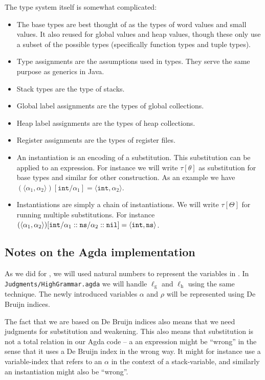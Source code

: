 The type system itself is somewhat complicated:

\begin{itemize}
\item The base types are best thought of as the types of word values and small
  values. It also reused for global values and heap values, though these only
  use a subset of the possible types (specifically function types and tuple types).
\item Type assignments are the assumptions used in types. They serve the same
  purpose as generics in Java.
\item Stack types are the type of stacks.
\item Global label assignments are the types of global collections.
\item Heap label assignments are the types of heap collections.
\item Register assignments are the types of register files.
\item An instantiation is an encoding of a substitution. This substitution can
  be applied to an expression. For instance we will write $\tau[\theta]$ as
  substitution for base types and similar for other construction. As an example
  we have
  $(\langle \alpha_1, \alpha_2 \rangle)[\mathtt{int} / \alpha_1] = \langle
  \mathtt{int}, \alpha_2 \rangle$.
\item Instantiations are simply a chain of instantiations. We will write
  $\tau[\Theta]$ for running multiple substitutions.  For instance
  $(\langle \alpha_1, \alpha_2 \rangle)[\mathtt{int} / \alpha_1 :: \mathtt{ns} /
  \alpha_2 :: \mathtt{nil}] = \langle \mathtt{int}, \mathtt{ns} \rangle$.
\end{itemize}

\subsection{Notes on the Agda implementation}

As we did for \ATALe, we will used natural numbers to represent the variables in
\ATAL. In \texttt{Judgments/HighGrammar.agda} we will handle $\ell_{\mathrm{g}}$
and $\ell_{\mathrm{h}}$ using the same technique. The newly introduced variables
$\alpha$ and $\rho$ will be represented using De Bruijn indices.

The fact that we are based on De Bruijn indices also means that we need
judgments for substitution and weakening. This also means that substitution is
not a total relation in our Agda code -- a an expression might be ``wrong'' in
the sense that it uses a De Bruijn index in the wrong way. It might for instance
use a variable-index that refers to an $\alpha$ in the context of a
stack-variable, and similarly an instantiation might also be ``wrong''.

